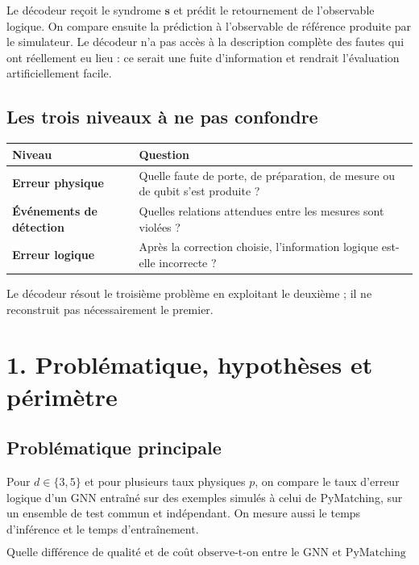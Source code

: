 \documentclass[11pt,a4paper]{article}
\begin{document}
Le décodeur reçoit le syndrome $\mathbf s$ et prédit le retournement de
l'observable logique. On compare ensuite la prédiction à l'observable de
référence produite par le simulateur. Le décodeur n'a pas accès à la
description complète des fautes qui ont réellement eu lieu : ce serait une
fuite d'information et rendrait l'évaluation artificiellement facile.

\subsection{Les trois niveaux à ne pas confondre}

\begin{center}
\begin{tabularx}{\textwidth}{>{\bfseries}p{3.2cm} X}
\toprule
Niveau & Question \\
\midrule
Erreur physique & Quelle faute de porte, de préparation, de mesure ou de qubit s'est produite ? \\
Événements de détection & Quelles relations attendues entre les mesures sont violées ? \\
Erreur logique & Après la correction choisie, l'information logique est-elle incorrecte ? \\
\bottomrule
\end{tabularx}
\end{center}

Le décodeur résout le troisième problème en exploitant le deuxième ; il ne
reconstruit pas nécessairement le premier.

\section{1. Problématique, hypothèses et périmètre}

\subsection{Problématique principale}

Pour $d\in\{3,5\}$ et pour plusieurs taux physiques $p$, on compare le taux
d'erreur logique d'un GNN entraîné sur des exemples simulés à celui de
PyMatching, sur un ensemble de test commun et indépendant. On mesure aussi
le temps d'inférence et le temps d'entraînement.

\[
\boxed{\text{Quelle différence de qualité et de coût observe-t-on entre
le GNN et PyMatching dans un protocole contrôlé ?}}
\]
\end{document}
